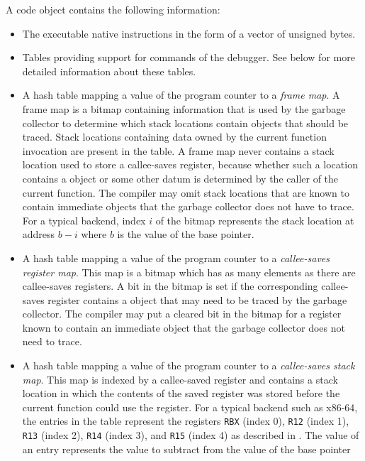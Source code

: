 A code object contains the following information:

\begin{itemize}
\item The executable native instructions in the form of a vector of
  unsigned bytes.
\item Tables providing support for commands of the debugger.  See
  below for more detailed information about these tables.
\item A hash table mapping a value of the program counter to a
  \emph{frame map}.  A frame map is a bitmap containing information
  that is used by the garbage collector to determine which stack
  locations contain \commonlisp{} objects that should be traced.
  Stack locations containing data owned by the current function
  invocation are present in the table.  A frame map never contains a
  stack location used to store a callee-saves register, because
  whether such a location contains a \commonlisp{} object or some
  other datum is determined by the caller of the current function.
  The compiler may omit stack locations that are known to contain
  immediate \commonlisp{} objects that the garbage collector does not
  have to trace.  For a typical backend, index $i$ of the bitmap
  represents the stack location at address $b-i$ where $b$ is the
  value of the base pointer.
\item A hash table mapping a value of the program counter to a
  \emph{callee-saves register map}.  This map is a bitmap which has as
  many elements as there are callee-saves registers.  A bit in the
  bitmap is set if the corresponding callee-saves register contains a
  \commonlisp{} object that may need to be traced by the garbage
  collector.  The compiler may put a cleared bit in the bitmap for a
  register known to contain an immediate \commonlisp{} object that the
  garbage collector does not need to trace.
\item A hash table mapping a value of the program counter to a
  \emph{callee-saves stack map}.  This map is indexed by a
  callee-saved register and contains a stack location in which the
  contents of the saved register was stored before the current
  function could use the register.  For a typical backend such as
  x86-64, the entries in the table represent the registers
  \texttt{RBX} (index 0), \texttt{R12} (index 1), \texttt{R13} (index
  2), \texttt{R14} (index 3), and \texttt{R15} (index 4) as described
  in .  The value of an entry
  represents the value to subtract from the value of the base pointer

\end{itemize}
